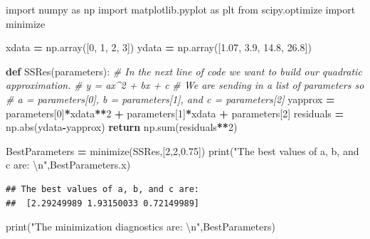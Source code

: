 \documentclass[
]{book}
\newenvironment{Shaded}{\begin{snugshade}}{\end{snugshade}}
\newcommand{\BuiltInTok}[1]{#1}
\newcommand{\CharTok}[1]{\textcolor[rgb]{0.31,0.60,0.02}{#1}}
\newcommand{\CommentTok}[1]{\textcolor[rgb]{0.56,0.35,0.01}{\textit{#1}}}
\newcommand{\ControlFlowTok}[1]{\textcolor[rgb]{0.13,0.29,0.53}{\textbf{#1}}}
\newcommand{\DecValTok}[1]{\textcolor[rgb]{0.00,0.00,0.81}{#1}}
\newcommand{\FloatTok}[1]{\textcolor[rgb]{0.00,0.00,0.81}{#1}}
\newcommand{\ImportTok}[1]{#1}
\newcommand{\KeywordTok}[1]{\textcolor[rgb]{0.13,0.29,0.53}{\textbf{#1}}}
\newcommand{\NormalTok}[1]{#1}
\newcommand{\OperatorTok}[1]{\textcolor[rgb]{0.81,0.36,0.00}{\textbf{#1}}}
\newcommand{\StringTok}[1]{\textcolor[rgb]{0.31,0.60,0.02}{#1}}
\theoremstyle{definition}
\theoremstyle{definition}
\theoremstyle{definition}
\theoremstyle{remark}
\begin{document}
\begin{Shaded}
\begin{Highlighting}[]
\ImportTok{import}\NormalTok{ numpy }\ImportTok{as}\NormalTok{ np}
\ImportTok{import}\NormalTok{ matplotlib.pyplot }\ImportTok{as}\NormalTok{ plt}
\ImportTok{from}\NormalTok{ scipy.optimize }\ImportTok{import}\NormalTok{ minimize}

\NormalTok{xdata }\OperatorTok{=}\NormalTok{ np.array([}\DecValTok{0}\NormalTok{, }\DecValTok{1}\NormalTok{, }\DecValTok{2}\NormalTok{, }\DecValTok{3}\NormalTok{])}
\NormalTok{ydata }\OperatorTok{=}\NormalTok{ np.array([}\FloatTok{1.07}\NormalTok{, }\FloatTok{3.9}\NormalTok{, }\FloatTok{14.8}\NormalTok{, }\FloatTok{26.8}\NormalTok{])}

\KeywordTok{def}\NormalTok{ SSRes(parameters):}
  \CommentTok{\# In the next line of code we want to build our quadratic approximation.}
  \CommentTok{\# y = ax\^{}2 + bx + c}
  \CommentTok{\# We are sending in a list of parameters so }
  \CommentTok{\# a = parameters[0], b = parameters[1], and c = parameters[2]}
\NormalTok{  yapprox }\OperatorTok{=}\NormalTok{ parameters[}\DecValTok{0}\NormalTok{]}\OperatorTok{*}\NormalTok{xdata}\OperatorTok{**}\DecValTok{2} \OperatorTok{+}\NormalTok{ parameters[}\DecValTok{1}\NormalTok{]}\OperatorTok{*}\NormalTok{xdata }\OperatorTok{+}\NormalTok{ parameters[}\DecValTok{2}\NormalTok{]}
\NormalTok{  residuals }\OperatorTok{=}\NormalTok{ np.}\BuiltInTok{abs}\NormalTok{(ydata}\OperatorTok{{-}}\NormalTok{yapprox)}
  \ControlFlowTok{return}\NormalTok{ np.}\BuiltInTok{sum}\NormalTok{(residuals}\OperatorTok{**}\DecValTok{2}\NormalTok{)}


\NormalTok{BestParameters }\OperatorTok{=}\NormalTok{ minimize(SSRes,[}\DecValTok{2}\NormalTok{,}\DecValTok{2}\NormalTok{,}\FloatTok{0.75}\NormalTok{])}
\BuiltInTok{print}\NormalTok{(}\StringTok{"The best values of a, b, and c are: }\CharTok{\textbackslash{}n}\StringTok{"}\NormalTok{,BestParameters.x)}
\end{Highlighting}
\end{Shaded}

\begin{verbatim}
## The best values of a, b, and c are: 
##  [2.29249989 1.93150033 0.72149989]
\end{verbatim}

\begin{Shaded}
\begin{Highlighting}[]
\BuiltInTok{print}\NormalTok{(}\StringTok{"The minimization diagnostics are: }\CharTok{\textbackslash{}n}\StringTok{"}\NormalTok{,BestParameters)}
\end{Highlighting}
\end{Shaded}
\end{document}
